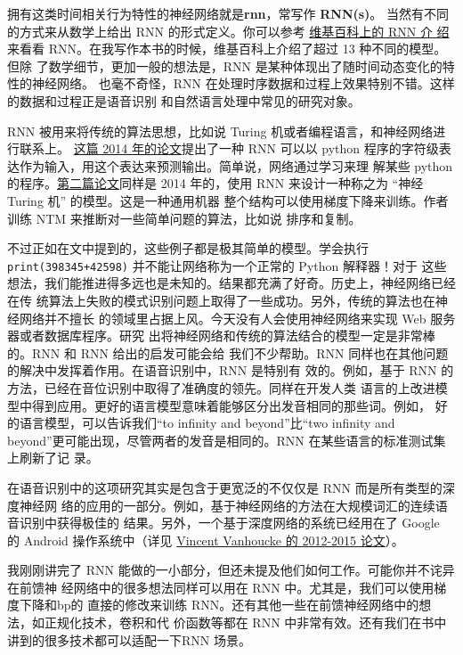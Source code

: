 拥有这类时间相关行为特性的神经网络就是\textbf{\gls{rnn}}，常写作 \textbf{RNN(s)}。
当然有不同的方式来从数学上给出 RNN 的形式定义。你可以参考
\href{http://en.wikipedia.org/wiki/Recurrent_neural_network}{维基百科上的 RNN 介
  绍}来看看 RNN。在我写作本书的时候，维基百科上介绍了超过 13 种不同的模型。但除
了数学细节，更加一般的想法是，RNN 是某种体现出了随时间动态变化的特性的神经网络。
也毫不奇怪，RNN 在处理时序数据和过程上效果特别不错。这样的数据和过程正是语音识别
和自然语言处理中常见的研究对象。

RNN 被用来将传统的算法思想，比如说 Turing 机或者编程语言，和神经网络进行联系上。%
\href{http://arxiv.org/abs/1410.4615}{这篇 2014 年的论文}提出了一种 RNN 可以以
python 程序的字符级表达作为输入，用这个表达来预测输出。简单说，网络通过学习来理
解某些 python 的程序。\href{http://arxiv.org/abs/1410.5401}{第二篇论文}同样是
2014 年的，使用 RNN 来设计一种称之为 “神经 Turing 机” 的模型。这是一种通用机器
整个结构可以使用梯度下降来训练。作者训练 NTM 来推断对一些简单问题的算法，比如说
排序和复制。

不过正如在文中提到的，这些例子都是极其简单的模型。学会执行
\lstinline!print(398345+42598)!  并不能让网络称为一个正常的 Python 解释器！对于
这些想法，我们能推进得多远也是未知的。结果都充满了好奇。历史上，神经网络已经在传
统算法上失败的模式识别问题上取得了一些成功。另外，传统的算法也在神经网络并不擅长
的领域里占据上风。今天没有人会使用神经网络来实现 Web 服务器或者数据库程序。研究
出将神经网络和传统的算法结合的模型一定是非常棒的。RNN 和 RNN 给出的启发可能会给
我们不少帮助。RNN 同样也在其他问题的解决中发挥着作用。在语音识别中，RNN 是特别有
效的。例如，基于 RNN 的方法，已经在音位识别中取得了准确度的领先。同样在开发人类
语言的上改进模型中得到应用。更好的语言模型意味着能够区分出发音相同的那些词。例如，
好的语言模型，可以告诉我们“to infinity and beyond”比“two infinity and
beyond”更可能出现，尽管两者的发音是相同的。RNN 在某些语言的标准测试集上刷新了记
录。

在语音识别中的这项研究其实是包含于更宽泛的不仅仅是 RNN 而是所有类型的深度神经网
络的应用的一部分。例如，基于神经网络的方法在大规模词汇的连续语音识别中获得极佳的
结果。另外，一个基于深度网络的系统已经用在了 Google 的 Android 操作系统中（详见
  \href{http://research.google.com/pubs/VincentVanhoucke.html}{Vincent Vanhoucke
    的 2012-2015 论文}）。

我刚刚讲完了 RNN 能做的一小部分，但还未提及他们如何工作。可能你并不诧异在前馈神
经网络中的很多想法同样可以用在 RNN 中。尤其是，我们可以使用梯度下降和\gls*{bp}的
直接的修改来训练 RNN。还有其他一些在前馈神经网络中的想法，如正规化技术，卷积和代
价函数等都在 RNN 中非常有效。还有我们在书中讲到的很多技术都可以适配一下RNN 场景。\\

